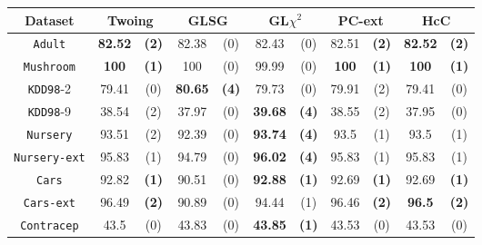 \begin{table}
\small
\centering
\begin{tabular}{c|cc|cc|cc|cc|cc} 
Dataset             & \multicolumn{2}{c|}{Twoing} &  \multicolumn{2}{c|}{GLSG}  & \multicolumn{2}{c|}{GL$\chi^2$} & \multicolumn{2}{c|}{PC-ext}& \multicolumn{2}{c}{HcC}\\
\hline
{\tt Adult}         &  {\bf 82.52} & {\bf (2)}    &  82.38       & (0)          &  82.43       & (0)              & 82.51      & {\bf (2)}    & {\bf 82.52}& {\bf (2)}  \\
{\tt Mushroom}      &  {\bf 100}   & {\bf (1)}    &  100         & (0)          &  99.99       & (0)              & {\bf 100 } & {\bf (1)}    & {\bf 100}  & {\bf (1)}  \\
{\tt KDD98}-2       &  79.41       & (0)          &  {\bf 80.65} & {\bf (4)}    &  79.73       & (0)              & 79.91      & (2)          & 79.41      & (0)        \\
{\tt KDD98}-9       &  38.54       & (2)          &  37.97       & (0)          &  {\bf 39.68} & {\bf (4)}        & 38.55      & (2)          & 37.95      & (0)        \\
{\tt Nursery}       &  93.51       & (2)          &  92.39       & (0)          &  {\bf 93.74} & {\bf (4)}        & 93.5       & (1)          & 93.5       & (1)        \\
{\tt Nursery-ext}   &  95.83       & (1)          &  94.79       & (0)          &  {\bf 96.02} & {\bf (4)}        & 95.83      & (1)          & 95.83      & (1)        \\
{\tt Cars}          &  92.82       & {\bf (1)}    &  90.51       & (0)          &  {\bf 92.88} & {\bf (1)}        & 92.69      & {\bf (1)}    & 92.69      & {\bf (1)}  \\
{\tt Cars-ext}      &  96.49       & {\bf (2)}    &  90.89       & (0)          &  94.44       & (1)              & 96.46      & {\bf (2)}    & {\bf 96.5} & {\bf (2)}  \\
{\tt Contracep}     &  43.5        & (0)          &  43.83       & (0)          &  {\bf 43.85} & {\bf (1)}        & 43.53      & (0)          & 43.53      & (0)        \\

\end{tabular}
\end{table}
